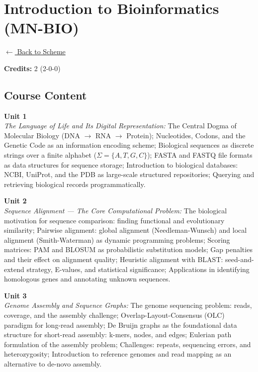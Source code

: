 \section*{Introduction to Bioinformatics (MN-BIO)}
\label{minor:BIO_L1}

\noindent \small{\hyperref[main:scheme]{$\leftarrow$ Back to Scheme}} \vspace{0.5cm}

\noindent \textbf{Credits:} 2 (2-0-0)

\subsection*{Course Content}
\noindent\textbf{Unit 1} \\
\textit{The Language of Life and Its Digital Representation:} The Central Dogma of Molecular Biology (DNA $\rightarrow$ RNA $\rightarrow$ Protein); Nucleotides, Codons, and the Genetic Code as an information encoding scheme; Biological sequences as discrete strings over a finite alphabet ($\Sigma = \{A, T, G, C\}$); FASTA and FASTQ file formats as data structures for sequence storage; Introduction to biological databases: NCBI, UniProt, and the PDB as large-scale structured repositories; Querying and retrieving biological records programmatically.

\vspace{0.3cm}

\noindent\textbf{Unit 2} \\
\textit{Sequence Alignment — The Core Computational Problem:} The biological motivation for sequence comparison: finding functional and evolutionary similarity; Pairwise alignment: global alignment (Needleman-Wunsch) and local alignment (Smith-Waterman) as dynamic programming problems; Scoring matrices: PAM and BLOSUM as probabilistic substitution models; Gap penalties and their effect on alignment quality; Heuristic alignment with BLAST: seed-and-extend strategy, E-values, and statistical significance; Applications in identifying homologous genes and annotating unknown sequences.

\vspace{0.3cm}

\noindent\textbf{Unit 3} \\
\textit{Genome Assembly and Sequence Graphs:} The genome sequencing problem: reads, coverage, and the assembly challenge; Overlap-Layout-Consensus (OLC) paradigm for long-read assembly; De Bruijn graphs as the foundational data structure for short-read assembly: k-mers, nodes, and edges; Eulerian path formulation of the assembly problem; Challenges: repeats, sequencing errors, and heterozygosity; Introduction to reference genomes and read mapping as an alternative to de-novo assembly.

